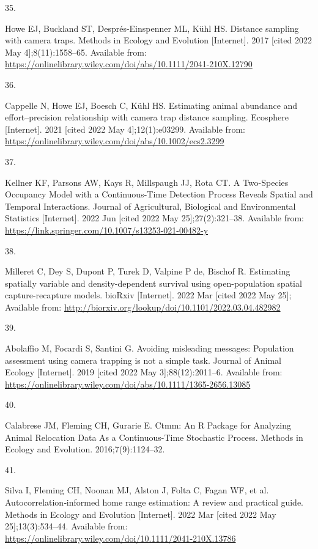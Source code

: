 \documentclass[10pt,a4paper]{article}
\newlength{\cslhangindent}
\newlength{\csllabelwidth}
\newlength{\cslentryspacingunit} %
\newenvironment{CSLReferences}[2] %
 {%
  \setlength{\parindent}{0pt}
  \ifodd #1
  \let\oldpar\par
  \def\par{\hangindent=\cslhangindent\oldpar}
  \fi
  \setlength{\parskip}{#2\cslentryspacingunit}
 }%
 {}
\newcommand{\CSLLeftMargin}[1]{\parbox[t]{\csllabelwidth}{#1}}
\newcommand{\CSLRightInline}[1]{\parbox[t]{\linewidth - \csllabelwidth}{#1}\break}
\begin{document}
\begin{CSLReferences}{0}{0}
\leavevmode\hypertarget{ref-howe_distance_2017}{}%
\CSLLeftMargin{35. }
\CSLRightInline{Howe EJ, Buckland ST, Després-Einspenner ML, Kühl HS. Distance sampling with camera traps. Methods in Ecology and Evolution {[}Internet{]}. 2017 {[}cited 2022 May 4{]};8(11):1558--65. Available from: \url{https://onlinelibrary.wiley.com/doi/abs/10.1111/2041-210X.12790}}

\leavevmode\hypertarget{ref-cappelle_estimating_2021}{}%
\CSLLeftMargin{36. }
\CSLRightInline{Cappelle N, Howe EJ, Boesch C, Kühl HS. Estimating animal abundance and effort--precision relationship with camera trap distance sampling. Ecosphere {[}Internet{]}. 2021 {[}cited 2022 May 4{]};12(1):e03299. Available from: \url{https://onlinelibrary.wiley.com/doi/abs/10.1002/ecs2.3299}}

\leavevmode\hypertarget{ref-kellner_two-species_2022}{}%
\CSLLeftMargin{37. }
\CSLRightInline{Kellner KF, Parsons AW, Kays R, Millspaugh JJ, Rota CT. A {Two}-{Species} {Occupancy} {Model} with a {Continuous}-{Time} {Detection} {Process} {Reveals} {Spatial} and {Temporal} {Interactions}. Journal of Agricultural, Biological and Environmental Statistics {[}Internet{]}. 2022 Jun {[}cited 2022 May 25{]};27(2):321--38. Available from: \url{https://link.springer.com/10.1007/s13253-021-00482-y}}

\leavevmode\hypertarget{ref-milleret_estimating_2022}{}%
\CSLLeftMargin{38. }
\CSLRightInline{Milleret C, Dey S, Dupont P, Turek D, Valpine P de, Bischof R. Estimating spatially variable and density-dependent survival using open-population spatial capture-recapture models. bioRxiv {[}Internet{]}. 2022 Mar {[}cited 2022 May 25{]}; Available from: \url{http://biorxiv.org/lookup/doi/10.1101/2022.03.04.482982}}

\leavevmode\hypertarget{ref-abolaffio_avoiding_2019}{}%
\CSLLeftMargin{39. }
\CSLRightInline{Abolaffio M, Focardi S, Santini G. Avoiding misleading messages: {Population} assessment using camera trapping is not a simple task. Journal of Animal Ecology {[}Internet{]}. 2019 {[}cited 2022 May 3{]};88(12):2011--6. Available from: \url{https://onlinelibrary.wiley.com/doi/abs/10.1111/1365-2656.13085}}

\leavevmode\hypertarget{ref-Calabrese2016}{}%
\CSLLeftMargin{40. }
\CSLRightInline{Calabrese JM, Fleming CH, Gurarie E. Ctmm: An {R} {Package} for {Analyzing} {Animal} {Relocation} {Data} {As} a {Continuous}-{Time} {Stochastic} {Process}. Methods in Ecology and Evolution. 2016;7(9):1124--32. }

\leavevmode\hypertarget{ref-silva_autocorrelationinformed_2022}{}%
\CSLLeftMargin{41. }
\CSLRightInline{Silva I, Fleming CH, Noonan MJ, Alston J, Folta C, Fagan WF, et al. Autocorrelation‐informed home range estimation: {A} review and practical guide. Methods in Ecology and Evolution {[}Internet{]}. 2022 Mar {[}cited 2022 May 25{]};13(3):534--44. Available from: \url{https://onlinelibrary.wiley.com/doi/10.1111/2041-210X.13786}}


\end{CSLReferences}
\end{document}
